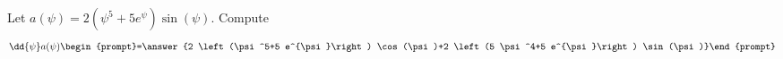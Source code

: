 \documentclass{ximera}
\author{Bart Snapp}
\begin{document}
\begin{exercise}
Let $a(\psi) = 2 \left(\psi ^5+5 e^{\psi }\right) \sin (\psi )$. Compute
\[
\dd{\psi}a(\psi)
\begin{prompt}=\answer{2 \left(\psi ^5+5 e^{\psi }\right) \cos (\psi )+2 \left(5 \psi ^4+5 e^{\psi }\right) \sin (\psi )}\end{prompt}
\]
\end{exercise}
\end{document}
